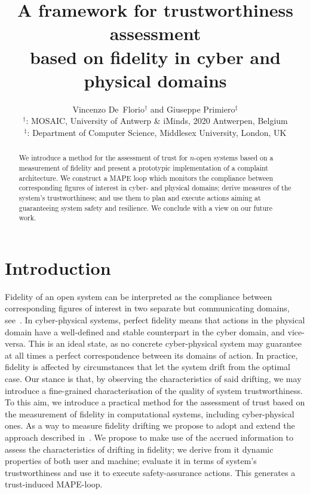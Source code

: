 \documentclass{article}
\begin{document}
\title{A framework for trustworthiness assessment\\based on fidelity in cyber and physical domains}





\author{Vincenzo De~Florio${}^\dagger$ and Giuseppe Primiero${}^\ddagger$\\
${}^\dagger$: MOSAIC, University of Antwerp \& iMinds, 2020 Antwerpen, Belgium\\
${}^\ddagger$: Department of Computer Science, Middlesex University, London, UK}












\maketitle
\begin{abstract}
We introduce a method for the assessment of trust for $n$-open systems based on a measurement of fidelity and present a prototypic implementation of a complaint architecture. We construct a MAPE loop which monitors the compliance between corresponding figures of interest in cyber- and physical domains; derive measures of the system's trustworthiness; and use them to plan and execute actions aiming at guaranteeing system safety and resilience. We conclude with a view on our future work.
\end{abstract}





\section{Introduction}\label{intro}

Fidelity of an open system can be interpreted as the compliance between corresponding figures of interest in two separate but communicating domains, see~\cite{DF14a}. 
In cyber-physical systems, perfect fidelity means that actions in the physical domain 
have a well-defined and stable counterpart in the cyber domain, and vice-versa. This is an ideal state,
as no concrete cyber-physical system may guarantee at all times a perfect correspondence between its domains of action. In practice, fidelity is affected by circumstances that let the system drift from the optimal case.
Our stance is that, by observing the characteristics of said drifting, we may introduce a fine-grained characterisation of the quality of system trustworthiness. 
To this aim, we introduce a practical method for the assessment of trust based on the measurement of fidelity in computational systems, including cyber-physical ones. As a way to measure fidelity drifting we propose to adopt and extend the approach described in~\cite{DFB12b,DB07a}.
We propose to make use of the accrued information to assess the characteristics of drifting in fidelity; we derive from it dynamic properties of both user and machine; evaluate it in terms of system's trustworthiness and use it to execute safety-assurance actions. This generates a trust-induced MAPE-loop.
\end{document}
